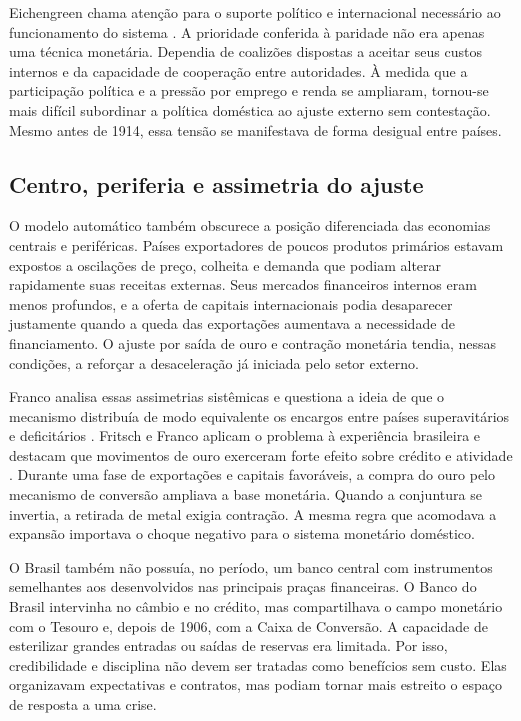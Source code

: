 Eichengreen chama atenção para o suporte político e internacional necessário ao funcionamento do sistema \cite{eichengreen1996}. A prioridade conferida à paridade não era apenas uma técnica monetária. Dependia de coalizões dispostas a aceitar seus custos internos e da capacidade de cooperação entre autoridades. À medida que a participação política e a pressão por emprego e renda se ampliaram, tornou-se mais difícil subordinar a política doméstica ao ajuste externo sem contestação. Mesmo antes de 1914, essa tensão se manifestava de forma desigual entre países.

\subsection{Centro, periferia e assimetria do ajuste}

O modelo automático também obscurece a posição diferenciada das economias centrais e periféricas. Países exportadores de poucos produtos primários estavam expostos a oscilações de preço, colheita e demanda que podiam alterar rapidamente suas receitas externas. Seus mercados financeiros internos eram menos profundos, e a oferta de capitais internacionais podia desaparecer justamente quando a queda das exportações aumentava a necessidade de financiamento. O ajuste por saída de ouro e contração monetária tendia, nessas condições, a reforçar a desaceleração já iniciada pelo setor externo.

Franco analisa essas assimetrias sistêmicas e questiona a ideia de que o mecanismo distribuía de modo equivalente os encargos entre países superavitários e deficitários \cite{franco1988}. Fritsch e Franco aplicam o problema à experiência brasileira e destacam que movimentos de ouro exerceram forte efeito sobre crédito e atividade \cite{fritschfranco1992}. Durante uma fase de exportações e capitais favoráveis, a compra do ouro pelo mecanismo de conversão ampliava a base monetária. Quando a conjuntura se invertia, a retirada de metal exigia contração. A mesma regra que acomodava a expansão importava o choque negativo para o sistema monetário doméstico.

O Brasil também não possuía, no período, um banco central com instrumentos semelhantes aos desenvolvidos nas principais praças financeiras. O Banco do Brasil intervinha no câmbio e no crédito, mas compartilhava o campo monetário com o Tesouro e, depois de 1906, com a Caixa de Conversão. A capacidade de esterilizar grandes entradas ou saídas de reservas era limitada. Por isso, credibilidade e disciplina não devem ser tratadas como benefícios sem custo. Elas organizavam expectativas e contratos, mas podiam tornar mais estreito o espaço de resposta a uma crise.

